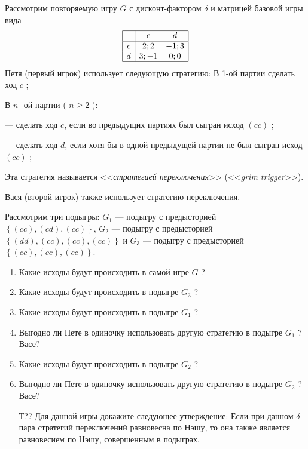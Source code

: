 \begin{problem}

Рассмотрим повторяемую игру  $G$  с дисконт-фактором  $\delta $  и матрицей базовой игры вида
\[\begin{array}{|c|cc|}  \hline {} & {c} & {d} \\  \hline {c} & {2;2} & {-1;3} \\ {d} & {3;-1} & {0;0} \\  \hline  \end{array}\]
Петя (первый игрок) использует следующую стратегию:
В 1-ой партии сделать ход  $c$ ;

В  $n$ -ой партии ( $n\ge 2$ ):

       --- сделать ход  $c$, если во  предыдущих партиях был сыгран исход  $\left(cc\right)$ ;

       --- сделать ход  $d$, если хотя бы в одной предыдущей партии не был сыгран исход  $\left(cc\right)$ ;

Эта стратегия называется <<{\it стратегией переключения}>> (<<{\it grim trigger}>>).

Вася (второй игрок) также использует стратегию переключения.

Рассмотрим три подыгры:  $G_{1} $  --- подыгру с предысторией  $\left\{\left(cc\right),\left(cd\right),\left(cc\right)\right\}$,  $G_{2} $  --- подыгру с предысторией  $\left\{\left(dd\right),\left(cc\right),\left(cc\right),\left(cc\right)\right\}$  и  $G_{3} $  --- подыгру с предысторией  $\left\{\left(cc\right),\left(cc\right),\left(cc\right)\right\}$.
\begin{enumerate}
\item  Какие исходы будут происходить в самой игре  $G$ ?\par
\item Какие исходы будут происходить в подыгре  $G_{3} $ ?\par
\item  Какие исходы будут происходить в подыгре  $G_{1} $ ?\par
\item Выгодно ли Пете в одиночку использовать другую стратегию в подыгре  $G_{1} $ ? Васе?\par
\item Какие исходы будут происходить в подыгре  $G_{2} $ ?\par
\item Выгодно ли Пете в одиночку использовать другую стратегию в подыгре  $G_{2} $ ? Васе?\par
\item [Т??] Для данной игры докажите следующее утверждение:
Если при данном  $\delta $  пара стратегий переключений равновесна по Нэшу, то она также является равновесием по Нэшу, совершенным в подыграх.
\end{enumerate}


\begin{sol}

\end{sol}
\end{problem}




